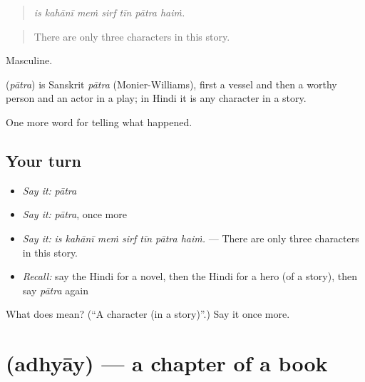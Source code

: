 \begin{quote}
      
\end{quote}

\begin{quote}
\emph{is kahānī meṁ sirf tīn pātra haiṁ.}
\end{quote}

\begin{quote}
There are only three characters in this story.
\end{quote}

Masculine.

\begin{cousinweb}
\textbf{} (\emph{pātra}) is Sanskrit \emph{pātra} (Monier-Williams), first a vessel and then a worthy person and an actor in a play; in Hindi it is any character in a story.
\end{cousinweb}

\begin{grammarlens}[title={What you've built}]
One more word for telling what happened.
\end{grammarlens}

\subsection*{Your turn}
\begin{itemize}
\raggedright
  \item \emph{Say it:} \emph{pātra}
  \item \emph{Say it:} \emph{pātra}, once more
  \item \emph{Say it:} \emph{is kahānī meṁ sirf tīn pātra haiṁ.} — There are only three characters in this story.
  \item \emph{Recall:} say the Hindi for a novel, then the Hindi for a hero (of a story), then say \emph{pātra} again
\end{itemize}

\begin{tcolorbox}[breakable,colback=teal!4,colframe=teal!35!black,title={Before you move on}]
What does  mean? (\textquotedblleft{}A character (in a story)\textquotedblright{}.) Say it once more.
\end{tcolorbox}
\section[\texorpdfstring{\hi{अध्याय} (adhyāy)}{अध्याय (adhyāy)}]{ (adhyāy) — a chapter of a book}

